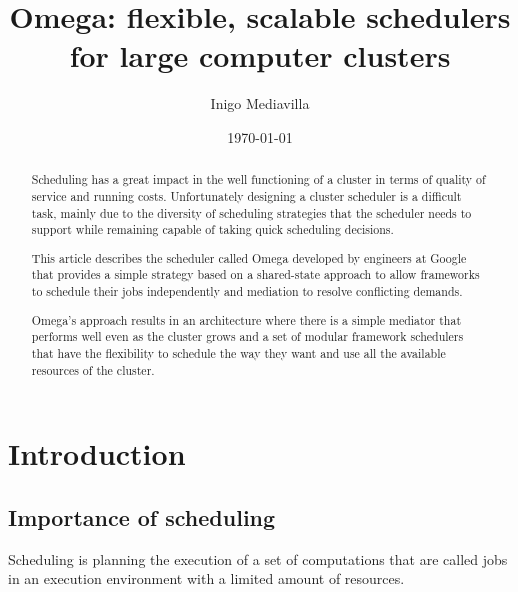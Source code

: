 \documentclass{svjour3}                     %
\begin{document}
\title{  Omega: flexible, scalable schedulers for large computer clusters  }


\author{ Inigo Mediavilla }

\date{\today}

\maketitle

\begin{abstract}

Scheduling has a great impact in the well functioning of a cluster in
terms of quality of service and running costs.  Unfortunately
designing a cluster scheduler is a difficult task, mainly due to the
diversity of scheduling strategies that the scheduler needs to support
while remaining capable of taking quick scheduling decisions.

This article describes the scheduler called Omega developed by
engineers at Google that provides a simple strategy based on a
shared-state approach to allow frameworks to schedule their jobs
independently and mediation to resolve conflicting demands. 

Omega's approach results in an architecture where there is a simple 
mediator that performs well even as the cluster grows and a set of
modular framework schedulers that have the flexibility to schedule
the way they want and use all the available resources of the cluster.

\end{abstract}

\section{Introduction}

\subsection{Importance of scheduling}

Scheduling is planning the execution of a set of computations that
are called jobs in an execution environment with a limited amount of
resources.
\end{document}
